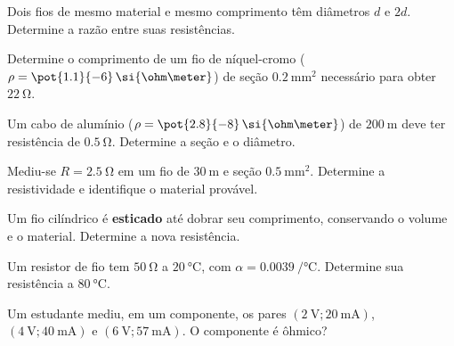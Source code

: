 \begin{questao}[1]{}

Dois fios de mesmo material e mesmo comprimento têm diâmetros $d$ e $2d$.
Determine a razão entre suas resistências.


\end{questao}

\blocoaplicacao
\begin{questao}[2]{}

Determine o comprimento de um fio de níquel-cromo
($\rho=\pot{1.1}{-6}\,\si{\ohm\meter}$) de seção
$\SI{0.2}{\milli\meter\squared}$ necessário para obter
$\SI{22}{\ohm}$.


\end{questao}
\begin{questao}[2]{}

Um cabo de alumínio ($\rho=\pot{2.8}{-8}\,\si{\ohm\meter}$) de
$\SI{200}{\meter}$ deve ter resistência de $\SI{0.5}{\ohm}$. Determine a seção
e o diâmetro.


\end{questao}
\begin{questao}[2]{}

Mediu-se $R=\SI{2.5}{\ohm}$ em um fio de $\SI{30}{\meter}$ e seção
$\SI{0.5}{\milli\meter\squared}$. Determine a resistividade e identifique o
material provável.


\end{questao}
\begin{questao}[2]{}

Um fio cilíndrico é \textbf{esticado} até dobrar seu comprimento, conservando o
volume e o material. Determine a nova resistência.


\end{questao}
\begin{questao}[2]{}

Um resistor de fio tem $\SI{50}{\ohm}$ a $\SI{20}{\celsius}$, com
$\alpha=\SI{0.0039}{\per\celsius}$. Determine sua resistência a
$\SI{80}{\celsius}$.


\end{questao}
\begin{questao}[2]{}

Um estudante mediu, em um componente, os pares
$(\SI{2}{\volt};\SI{20}{\milli\ampere})$,
$(\SI{4}{\volt};\SI{40}{\milli\ampere})$ e
$(\SI{6}{\volt};\SI{57}{\milli\ampere})$. O componente é ôhmico?


\end{questao}
